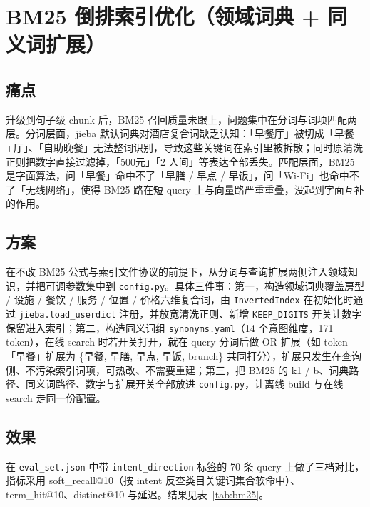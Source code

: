 \documentclass[11pt]{ctexart}
\begin{document}
\section{BM25 倒排索引优化（领域词典 + 同义词扩展）}

\subsection{痛点}

升级到句子级 chunk 后，BM25 召回质量未跟上，问题集中在分词与词项匹配两层。分词层面，jieba 默认词典对酒店复合词缺乏认知：「早餐厅」被切成「早餐+厅」、「自助晚餐」无法整词识别，导致这些关键词在索引里被拆散；同时原清洗正则把数字直接过滤掉，「500元」「2 人间」等表达全部丢失。匹配层面，BM25 是字面算法，问「早餐」命中不了「早膳 / 早点 / 早饭」，问「Wi-Fi」也命中不了「无线网络」，使得 BM25 路在短 query 上与向量路严重重叠，没起到字面互补的作用。

\subsection{方案}

在不改 BM25 公式与索引文件协议的前提下，从分词与查询扩展两侧注入领域知识，并把可调参数集中到 \texttt{config.py}。具体三件事：第一，构造领域词典覆盖房型 / 设施 / 餐饮 / 服务 / 位置 / 价格六维复合词，由 \texttt{InvertedIndex} 在初始化时通过 \texttt{jieba.load\_userdict} 注册，并放宽清洗正则、新增 \texttt{KEEP\_DIGITS} 开关让数字保留进入索引；第二，构造同义词组 \texttt{synonyms.yaml}（14 个意图维度，171 token），在线 search 时若开关打开，就在 query 分词后做 OR 扩展（如 token「早餐」扩展为 \{早餐, 早膳, 早点, 早饭, brunch\} 共同打分），扩展只发生在查询侧、不污染索引词项，可热改、不需要重建；第三，把 BM25 的 k1 / b、词典路径、同义词路径、数字与扩展开关全部放进 \texttt{config.py}，让离线 build 与在线 search 走同一份配置。

\subsection{效果}

在 \texttt{eval\_set.json} 中带 \texttt{intent\_direction} 标签的 70 条 query 上做了三档对比，指标采用 soft\_recall@10（按 intent 反查类目关键词集合软命中）、term\_hit@10、distinct@10 与延迟。结果见表~\ref{tab:bm25}。
\end{document}
